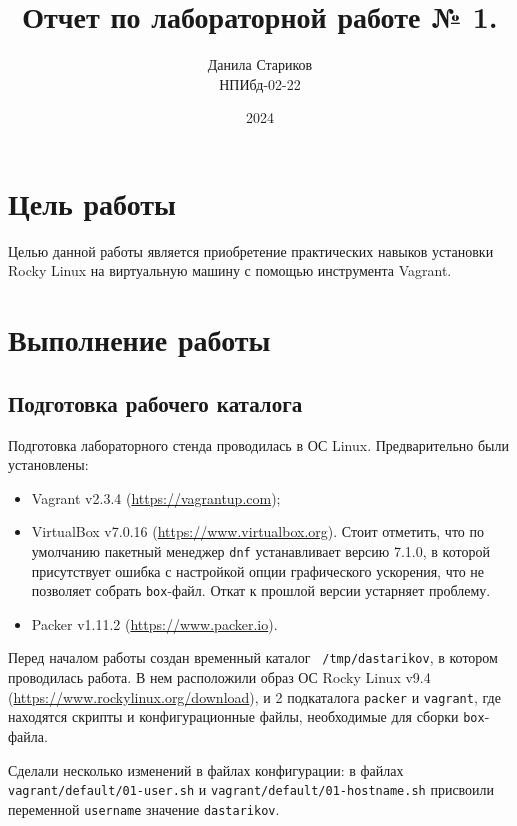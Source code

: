 

\title{Отчет по лабораторной работе № 1. \\ [Название]}
\author{Данила Стариков \\ НПИбд-02-22}
\date{2024}



\maketitle

\tableofcontents
\newpage

\section{Цель работы}
Целью данной работы является приобретение практических навыков установки Rocky Linux на виртуальную машину с помощью инструмента Vagrant.

\newpage
\section{Выполнение работы}
\subsection{Подготовка рабочего каталога}
Подготовка лабораторного стенда проводилась в ОС Linux. Предварительно были установлены:
\begin{itemize}
    \item Vagrant v2.3.4 (\url{https://vagrantup.com});
    \item VirtualBox v7.0.16 (\url{https://www.virtualbox.org}). Стоит отметить, что по умолчанию пакетный менеджер \texttt{dnf} устанавливает версию 7.1.0, в которой присутствует ошибка с настройкой опции графического ускорения, что не позволяет собрать \texttt{box}-файл. Откат к прошлой версии устарняет проблему.
    \item Packer v1.11.2 (\url{https://www.packer.io}).
\end{itemize}

Перед началом работы создан временный каталог \texttt{~/tmp/dastarikov}, в котором проводилась работа. В нем расположили образ ОС Rocky Linux v9.4  (\url{https://www.rockylinux.org/download}), и 2 подкаталога \texttt{packer} и \texttt{vagrant}, где находятся скрипты и конфигурационные файлы, необходимые для сборки \texttt{box}-файла.

Сделали несколько изменений в файлах конфигурации: в файлах \texttt{vagrant/default/01-user.sh} и \texttt{vagrant/default/01-hostname.sh} присвоили переменной \texttt{username} значение \texttt{dastarikov}.

